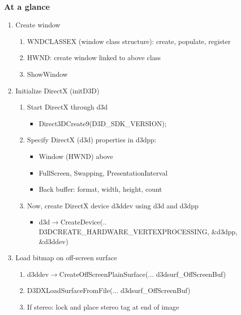 \begin{frame}\frametitle{At a glance}\logoEvolution\mypagenum
	\begin{enumerate}\tiny
		\item Create window
			\begin{enumerate}\tiny
				\item WNDCLASSEX (window class structure): create, populate, register
				\item HWND: create window linked to above class
				\item ShowWindow
			\end{enumerate}
		\item Initialize DirectX (initD3D)
			\begin{enumerate}\tiny
				\item Start DirectX through {\color{red}d3d}
					\begin{itemize}\tiny
						\item Direct3DCreate9(D3D\_SDK\_VERSION);
					\end{itemize}
				\item Specify DirectX (d3d) properties in {\color{red}d3dpp}: 
					\begin{itemize}\tiny
						\item Window (HWND) above
						\item FullScreen, Swapping, PresentationInterval
						\item Back buffer: format, width, height, count
					\end{itemize}				
				\item Now, create DirectX device {\color{red}d3ddev} using d3d and d3dpp
					\begin{itemize}\tiny
						\item d3d$\rightarrow$CreateDevice(.. D3DCREATE\_HARDWARE\_VERTEXPROCESSING, {\color{red}\&d3dpp}, {\color{red}\&d3ddev})
					\end{itemize}
			\end{enumerate}
		\item Load bitmap on off-screen surface
			\begin{enumerate}\tiny
				\item {\color{red}d3ddev}$\rightarrow$CreateOffScreenPlainSurface({\tiny... {\color{red}d3dsurf\_OffScreenBuf}})
				\item D3DXLoadSurfaceFromFile(... {\color{red}d3dsurf\_OffScreenBuf})
				\item If stereo: lock and place stereo tag at end of image
			\end{enumerate}

\end{enumerate}
\end{frame}
